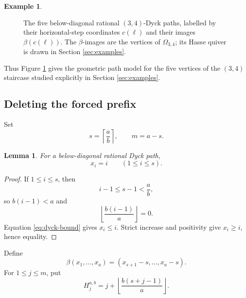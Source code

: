 \documentclass[12pt,a4paper,english,reqno]{amsart}
\theoremstyle{plain}
\newtheorem{lemma}[theorem]{Lemma}
\theoremstyle{definition}
\newtheorem{exm}[theorem]{Example}
\begin{document}
\begin{exm}
\begin{figure}[htbp]
\caption{The five below-diagonal rational $(3,4)$-Dyck paths, labelled by
their horizontal-step coordinates $c(\ell)$ and their images
$\beta(c(\ell))$.  The $\beta$-images are the vertices of
$\Omega_{3,4}$; its Hasse quiver is drawn in Section \ref{sec:examples}.}
\label{fig:34-below-paths}
\end{figure}

Thus Figure \ref{fig:34-below-paths} gives the geometric path model for the
five vertices of the $(3,4)$ staircase studied explicitly in
Section \ref{sec:examples}. 
\end{exm}



\subsection{Deleting the forced prefix}

Set
\begin{equation}
 s=\left\lceil\frac ab\right\rceil,\qquad m=a-s.
\label{eq:s-m}
\end{equation}

\begin{lemma}
\label{lem:forced-prefix}
For a below-diagonal rational Dyck path,
\[
 x_i=i\qquad(1\leq i\leq s).
\]
\end{lemma}

\begin{proof}
If $1\leq i\leq s$, then
\[
 i-1\leq s-1<\frac ab,
\]
so $b(i-1)<a$ and
\[
 \left\lfloor\frac{b(i-1)}a\right\rfloor=0.
\]
Equation \eqref{eq:dyck-bound} gives $x_i\leq i$.  Strict increase and
positivity give $x_i\geq i$, hence equality.
\end{proof}

Define
\begin{equation}
 \beta(x_1,\ldots,x_a)
 =(x_{s+1}-s,\ldots,x_a-s).
\label{eq:beta}
\end{equation}
For $1\leq j\leq m$, put
\begin{equation}
 H_j^{a,b}
 =
 j+\left\lfloor\frac{b(s+j-1)}a\right\rfloor.
\label{eq:Dyck-H}
\end{equation}
\end{document}
